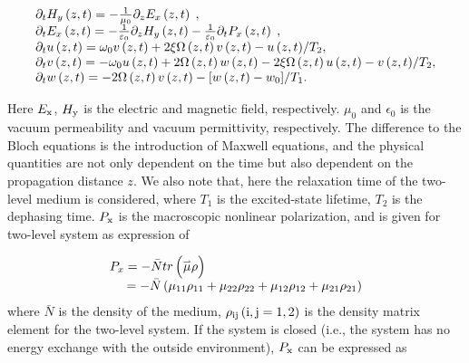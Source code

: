 \documentclass[10pt,letterpaper]{article}
\begin{document}
\begin{equation}
\begin{array}{l}
{\partial _t}{H_y}\left( {z,t} \right) =  - \frac{1}{{{\mu _0}}}{\partial _z}{E_x}\left( {z,t} \right)\;,\\
{\partial _t}{E_x}\left( {z,t} \right) =  - \frac{1}{{{\varepsilon _0}}}{\partial _z}{H_y}\left( {z,t} \right) - \frac{1}{{{\varepsilon _0}}}{\partial _t}{P_x}\left( {z,t} \right)\;,\\
{\partial _t}u\left( {z,t} \right) = {\omega _0}v\left( {z,t} \right) + 2\xi \Omega \left( {z,t} \right)v\left( {z,t} \right) - {{u\left( {z,t} \right)} \mathord{\left/
		{\vphantom {{u\left( {z,t} \right)} {{T_2}}}} \right.
		\kern-\nulldelimiterspace} {{T_2}}},\\
{\partial _t}v\left( {z,t} \right) =  - {\omega _0}u\left( {z,t} \right) + 2\Omega \left( {z,t} \right)w\left( {z,t} \right) - 2\xi \Omega \left( {z,t} \right)u\left( {z,t} \right) - {{v\left( {z,t} \right)} \mathord{\left/
		{\vphantom {{v\left( {z,t} \right)} {{T_2}}}} \right.
		\kern-\nulldelimiterspace} {{T_2}}},\\
{\partial _t}w\left( {z,t} \right) =  - 2\Omega \left( {z,t} \right)v\left( {z,t} \right) - {{\left[ {w\left( {z,t} \right) - {w_{0}}} \right]} \mathord{\left/
		{\vphantom {{\left[ {w\left( {z,t} \right) - {w_{0}}} \right]} {{T_1}}}} \right.
		\kern-\nulldelimiterspace} {{T_1}}}.
\end{array}
\label{eq10}
\end{equation}

Here $ E_{\rm{x}} $, $ H_{\rm{y}} $ is the electric and magnetic field, respectively.  $ \mu_{0} $ and $ \epsilon_{0} $ is the vacuum permeability and vacuum permittivity, respectively. The difference to the Bloch equations is the introduction of Maxwell equations, and the physical quantities are not only dependent on the time but also dependent on the propagation distance $ z $. We also note that, here the relaxation time of the two-level medium is considered, where $T_{1}$ is the excited-state lifetime, $T_{2}$ is the dephasing time.  $ P_{\rm{x}} $ is the macroscopic nonlinear polarization, and is given for two-level system as expression of \cite{Pan-Ruiqin-Permanent-dipole-moment-2011}

\begin{equation}
\begin{array}{l}
{P_x} =  - \bar{N}tr\left( {\mathord{\buildrel{\lower3pt\hbox{$\scriptscriptstyle\rightharpoonup$}} 
		\over \mu } \rho } \right)\\
\;\;\;\;\: =  - \bar{N}\left( {{\mu _{11}}{\rho _{11}} + {\mu _{22}}{\rho _{22}} + {\mu _{12}}{\rho _{12}} + {\mu _{21}}{\rho _{21}}} \right)
\end{array}
\label{eq11}
\end{equation}
where $ \bar{N} $ is the density of the medium, ${\rho _{\rm{ij}}}\left( {\rm{i,j} = 1, 2} \right)$  is the density matrix element for the two-level system. If the system is closed (i.e., the system has no energy exchange with the outside environment),  $ P_{\rm{x}} $ can be expressed as
\end{document}
